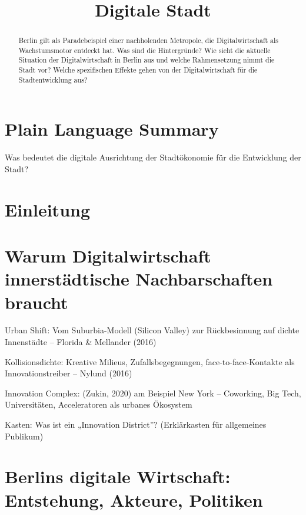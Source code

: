 \documentclass[
]{agujournal2019}
\begin{document}
\title{Digitale Stadt}



\begin{abstract}
Berlin gilt als Paradebeispiel einer nachholenden Metropole, die
Digitalwirtschaft als Wachstumsmotor entdeckt hat. Was sind die
Hintergründe? Wie sieht die aktuelle Situation der Digitalwirtschaft in
Berlin aus und welche Rahmensetzung nimmt die Stadt vor? Welche
spezifischen Effekte gehen von der Digitalwirtschaft für die
Stadtentwicklung aus?
\end{abstract}

\section*{Plain Language Summary}
Was bedeutet die digitale Ausrichtung der Stadtökonomie für die
Entwicklung der Stadt?




\section{Einleitung}\label{einleitung}

\section{Warum Digitalwirtschaft innerstädtische Nachbarschaften
braucht}\label{warum-digitalwirtschaft-innerstuxe4dtische-nachbarschaften-braucht}

Urban Shift: Vom Suburbia-Modell (Silicon Valley) zur Rückbesinnung auf
dichte Innenstädte -- Florida \& Mellander (2016)

Kollisionsdichte: Kreative Milieus, Zufallsbegegnungen,
face-to-face-Kontakte als Innovationstreiber -- Nylund (2016)

Innovation Complex: (Zukin, 2020) am Beispiel New York -- Coworking, Big
Tech, Universitäten, Acceleratoren als urbanes Ökosystem

Kasten: Was ist ein „Innovation District''? (Erklärkasten für
allgemeines Publikum)

\section{Berlins digitale Wirtschaft: Entstehung, Akteure,
Politiken}\label{berlins-digitale-wirtschaft-entstehung-akteure-politiken}
\end{document}
